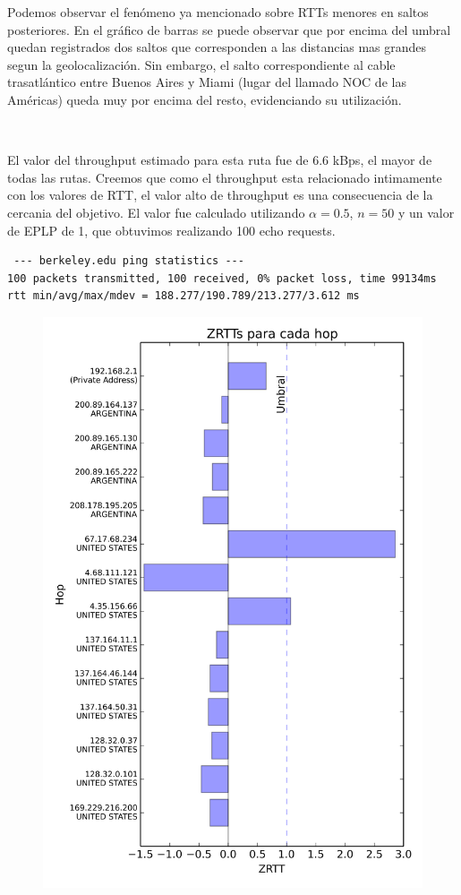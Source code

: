 \vspace{20pt}

Podemos observar el fenómeno ya mencionado sobre RTTs menores en saltos posteriores. En el gráfico de barras se puede observar que por encima del umbral quedan registrados dos saltos que corresponden a las distancias mas grandes segun la geolocalización. Sin embargo, el salto correspondiente al cable trasatlántico entre Buenos Aires y Miami (lugar del llamado NOC de las Américas) queda muy por encima del resto, evidenciando su utilización.

~

El valor del throughput estimado para esta ruta fue de $6.6$ kBps, el mayor de todas las rutas. Creemos que como el throughput esta relacionado intimamente con los valores de RTT, el valor alto de throughput es una consecuencia de la cercania del objetivo. El valor fue calculado utilizando $\alpha = 0.5$, $n = 50$ y un valor de EPLP de 1, que obtuvimos realizando 100 echo requests.

\begin{verbatim}
 --- berkeley.edu ping statistics ---
100 packets transmitted, 100 received, 0% packet loss, time 99134ms
rtt min/avg/max/mdev = 188.277/190.789/213.277/3.612 ms
\end{verbatim}

\begin{figure}[htp]
 \centering
 \includegraphics[scale=0.50]{imgs/berkeley.png}
\end{figure}


